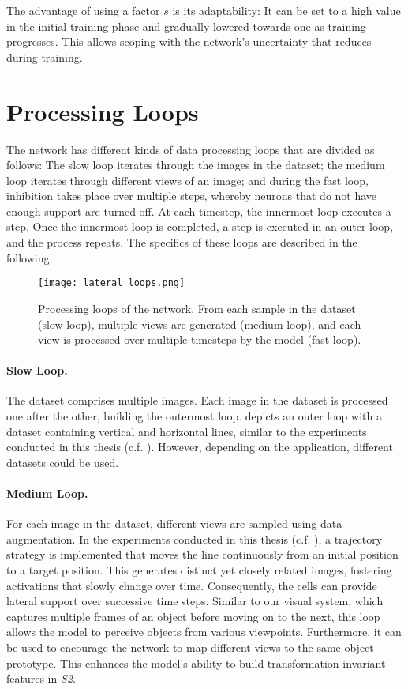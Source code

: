 The advantage of using a factor $s$ is its adaptability: It can be set to a high value in the initial training phase and gradually lowered towards one as training progresses. This allows scoping with the network's uncertainty that reduces during training.


\section{Processing Loops}
The network has different kinds of data processing loops that are divided as follows:
The slow loop iterates through the images in the dataset; the medium loop iterates through different views of an image; and during the fast loop, inhibition takes place over multiple steps, whereby neurons that do not have enough support are turned off.
At each timestep, the innermost loop executes a step. Once the innermost loop is completed, a step is executed in an outer loop, and the process repeats. The specifics of these loops are described in the following.

\begin{figure}[h]
    \centering
    \texttt{[image: lateral\_loops.png]}
    \caption[Processing loops of the network]{Processing loops of the network. From each sample in the dataset (slow loop), multiple views are generated (medium loop), and each view is processed over multiple timesteps by the model (fast loop).}
\end{figure}

\paragraph{Slow Loop.} The dataset comprises multiple images. Each image in the dataset is processed one after the other, building the outermost loop.  depicts an outer loop with a dataset containing vertical and horizontal lines, similar to the experiments conducted in this thesis (c.f. ). However, depending on the application, different datasets could be used.

\paragraph{Medium Loop.} For each image in the dataset, different views are sampled using data augmentation. In the experiments conducted in this thesis (c.f. ), a trajectory strategy is implemented that moves the line continuously from an initial position to a target position. This generates distinct yet closely related images, fostering activations that slowly change over time. Consequently, the cells can provide lateral support over successive time steps.
Similar to our visual system, which captures multiple frames of an object before moving on to the next, this loop allows the model to perceive objects from various viewpoints. Furthermore, it can be used to encourage the network to map different views to the same object prototype. This enhances the model's ability to build transformation invariant features in \emph{S2}.

